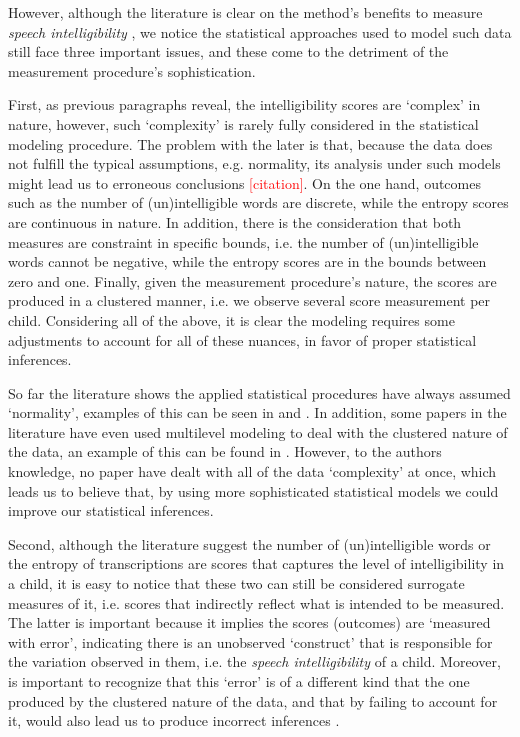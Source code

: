 However, although the literature is clear on the method's benefits to measure \textit{speech intelligibility} \cite{Boonen_et_al_2020, Boonen_et_al_2021, Hustad_et_al_2020}, we notice the statistical approaches used to model such data still face three important issues, and these come to the detriment of the measurement procedure's sophistication. 

First, as previous paragraphs reveal, the intelligibility scores are `complex' in nature, however, such `complexity' is rarely fully considered in the statistical modeling procedure. The problem with the later is that, because the data does not fulfill the typical assumptions, e.g. normality, its analysis under such models might lead us to erroneous conclusions \textcolor{red}{[citation]}. On the one hand, outcomes such as the number of (un)intelligible words are discrete, while the entropy scores are continuous in nature. In addition, there is the consideration that both measures are constraint in specific bounds, i.e. the number of (un)intelligible words cannot be negative, while the entropy scores are in the bounds between zero and one. Finally, given the measurement procedure's nature, the scores are produced in a clustered manner, i.e. we observe several score measurement per child. Considering all of the above, it is clear the modeling requires some adjustments to account for all of these nuances, in favor of proper statistical inferences.

So far the literature shows the applied statistical procedures have always assumed `normality', examples of this can be seen in \citet{Boonen_et_al_2021, Flipsen_et_al_2006} and \citet{Hustad_et_al_2020}. In addition, some papers in the literature have even used multilevel modeling to deal with the clustered nature of the data, an example of this can be found in \citet{Boonen_et_al_2021}. However, to the authors knowledge, no paper have dealt with all of the data `complexity' at once, which leads us to believe that, by using more sophisticated statistical models we could improve our statistical inferences. 

Second, although the literature suggest the number of (un)intelligible words or the entropy of transcriptions are scores that captures the level of intelligibility in a child, it is easy to notice that these two can still be considered surrogate measures of it, i.e. scores that indirectly reflect what is intended to be measured. The latter is important because it implies the scores (outcomes) are `measured with error', indicating there is an unobserved `construct' that is responsible for the variation observed in them, i.e. the \textit{speech intelligibility} of a child. Moreover, is important to recognize that this `error' is of a different kind that the one produced by the clustered nature of the data, and that by failing to account for it, would also lead us to produce incorrect inferences \cite{deHaan_et_al_2019}.

